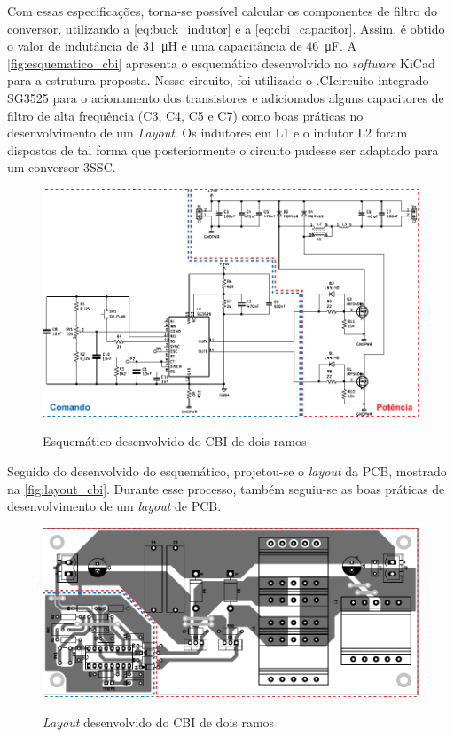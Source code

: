     Com essas especificações, torna-se possível calcular os componentes de filtro do conversor, utilizando a \autoref{eq:buck_indutor} e a \autoref{eq:cbi_capacitor}. Assim, é obtido o valor de indutância de \qty{31}{\micro\henry} e uma capacitância de \qty{46}{\micro\farad}. A \autoref{fig:esquematico_cbi} apresenta o esquemático desenvolvido no \textit{software} KiCad para a estrutura proposta. Nesse circuito, foi utilizado o \abreviatura.{CI}{circuito integrado} SG3525 para o acionamento dos transistores e adicionados alguns capacitores de filtro de alta frequência (C3, C4, C5 e C7) como boas práticas no desenvolvimento de um \textit{Layout}. Os indutores em L1 e o indutor L2 foram dispostos de tal forma que posteriormente o circuito pudesse ser adaptado para um conversor 3SSC.
    
    \begin{figure}[H]
    	\centering
    	\caption{Esquemático desenvolvido do CBI de dois ramos}
    	\includegraphics[scale=1]{pdf/layout/Esquematico_CBI_kicad_3.pdf}
        \label{fig:esquematico_cbi}
    \end{figure}
    
    Seguido do desenvolvido do esquemático, projetou-se o \textit{layout} da PCB, mostrado na \autoref{fig:layout_cbi}. Durante esse processo, também seguiu-se as boas práticas de desenvolvimento de um \textit{layout} de PCB. 
    
    \begin{figure}[H]
    	\centering
    	\caption{\textit{Layout} desenvolvido do CBI de dois ramos}
    	\includegraphics[scale=1]{pdf/layout/layout_CBI4.pdf}
        \label{fig:layout_cbi}
    \end{figure}
    
